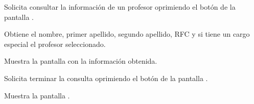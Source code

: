 \begin{UCtrayectoria}
	\UCpaso [\UCactor] Solicita consultar la información de un profesor oprimiendo el botón 
	de la pantalla .
	
	\UCpaso [\UCsist] Obtiene el nombre, primer apellido, segundo apellido, RFC y si tiene un cargo especial el profesor seleccionado.
	
	\UCpaso [\UCsist] Muestra la pantalla  con la información obtenida.
	
	\UCpaso [\UCactor] Solicita terminar la consulta oprimiendo el botón  de la pantalla .
	
	\UCpaso [\UCsist] Muestra la pantalla .
	
\end{UCtrayectoria}
